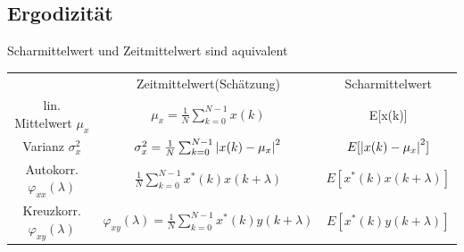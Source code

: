 \documentclass[10pt,a4paper]{article}
\begin{document}
\subsection{Ergodizität}
Scharmittelwert und Zeitmittelwert sind aquivalent\\
\scriptsize
\begin{center}
\begin{tabular}{|c|c|c|}
\cline{1-3}
        & Zeitmittelwert(Schätzung) & Scharmittelwert \\
\cline{1-3}
        lin. Mittelwert $\mu_x$ & $\mu_x = \frac{1}{N}\sum_{k=0}^{N-1}x(k)$ & E[x(k)] \\
\cline{1-3}
        Varianz $\sigma_x^2$ & $\sigma_x^2 = \frac{1}{N}\sum_{k=0}^{N-1}\abs{x(k)-\mu_x}^2$ & $E[\abs{x(k)-\mu_x}^2]$ \\
\cline{1-3}
        Autokorr. $\varphi_{xx}(\lambda)$ & $\frac{1}{N}\sum_{k=0}^{N-1} x^*(k)x(k+\lambda) $ & $E[x^*(k)x(k+\lambda)]$ \\
\cline{1-3}
        Kreuzkorr. $\varphi_{xy}(\lambda)$ & $\varphi_{xy}(\lambda)=\frac{1}{N}\sum_{k=0}^{N-1} x^*(k)y(k+\lambda) $ & $E[x^*(k)y(k+\lambda)]$ \\
\cline{1-3}
\end{tabular}
\end{center}
\end{document}
